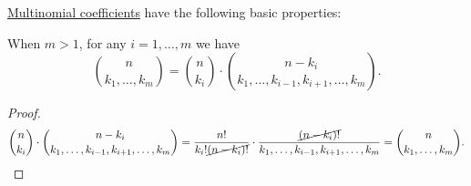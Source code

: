 \begin{proposition}\label{thm:def:multinomial_coefficient}
  \hyperref[def:multinomial_coefficient]{Multinomial coefficients} have the following basic properties:
  \begin{thmenum}
     When \( m > 1 \), for any \( i = 1, \ldots, m \) we have
    \begin{equation}\label{eq:thm:def:multinomial_coefficient/reduction}
      \binom n {k_1, \ldots, k_m} = \binom n {k_i} \cdot \binom {n - k_i} {k_1, \ldots, k_{i-1}, k_{i+1}, \ldots, k_m}.
    \end{equation}
  \end{thmenum}
\end{proposition}
\begin{proof}
  \begin{equation*}
    \binom n {k_i} \cdot \binom {n - k_i} {k_1, \ldots, k_{i-1}, k_{i+1}, \ldots, k_m}
    =
    \frac {n!} {k_i! \cancel{(n - k_i)!}} \cdot \frac {\cancel{(n - k_i)!}} {k_1, \ldots, k_{i-1}, k_{i+1}, \ldots, k_m}
    =
    \binom n {k_1,\ldots,k_m}.
  \end{equation*}
\end{proof}

